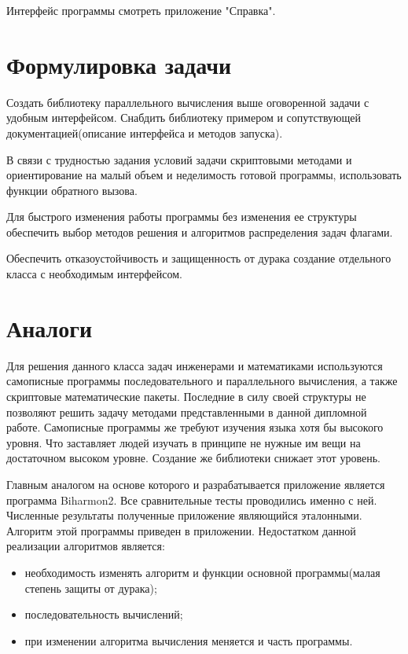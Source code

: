 Интерфейс программы смотреть приложение "Справка".

\section{Формулировка задачи}
Создать библиотеку параллельного вычисления выше оговоренной задачи с удобным интерфейсом. Снабдить библиотеку примером и сопутствующей документацией(описание интерфейса и методов запуска).

В связи с трудностью задания условий задачи скриптовыми методами и ориентирование на малый объем и неделимость готовой программы, использовать функции обратного вызова.

Для быстрого изменения работы программы без изменения ее структуры обеспечить выбор методов решения и алгоритмов распределения задач флагами.

Обеспечить отказоустойчивость и защищенность от дурака создание отдельного класса с необходимым интерфейсом.
\section{Аналоги}
Для решения данного класса задач инженерами и математиками используются самописные программы последовательного и параллельного вычисления, а также скриптовые математические пакеты. Последние в силу своей структуры не позволяют решить задачу методами представленными в данной дипломной работе.
Самописные программы же %
требуют изучения языка хотя бы высокого уровня. Что заставляет людей изучать в принципе не нужные им вещи на достаточном высоком уровне. Создание же библиотеки снижает этот уровень.

Главным аналогом на основе которого и разрабатывается приложение является программа Biharmon2. 
Все сравнительные тесты проводились именно с ней. Численные результаты полученные приложение являющийся эталонными.
Алгоритм этой программы приведен в приложении. Недостатком данной реализации алгоритмов является:
\begin{itemize}
	\item необходимость изменять алгоритм и функции основной программы(малая степень защиты от дурака);
	\item последовательность вычислений;
	\item при изменении алгоритма вычисления меняется и часть программы.
\end{itemize}
